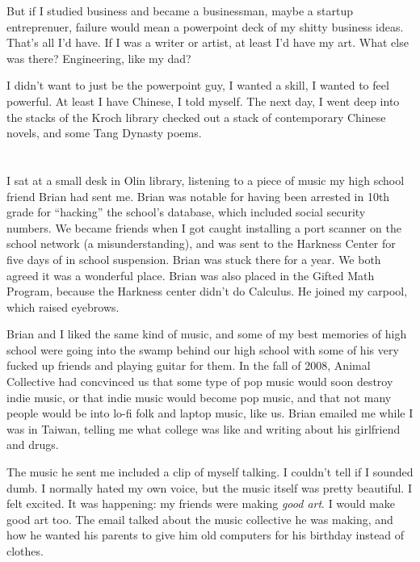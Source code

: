 But if I studied business and became a businessman, maybe a startup
entreprenuer, failure would mean a powerpoint deck of my shitty business ideas.
That's all I'd have.  If I was a writer or artist, at least I'd have my art.
What else was there?  Engineering, like my dad? 

I didn't want to just be the powerpoint guy, I wanted a skill, I wanted to feel
powerful.  At least I have Chinese, I told myself.  The next day, I went deep
into the stacks of the Kroch library checked out a stack of contemporary Chinese
novels, and some Tang Dynasty poems.

\section{}

I sat at a small desk in Olin library, listening to a piece of music my high
school friend Brian had sent me.  Brian was notable for having been arrested in
10th grade for ``hacking'' the school's database, which included social security
numbers.  We became friends when I got caught installing a port scanner on the
school network (a misunderstanding), and was sent to the Harkness Center for
five days of in school suspension.  Brian was stuck there for a year.  We both
agreed it was a wonderful place.  Brian was also placed in the Gifted Math
Program, because the Harkness center didn't do Calculus.  He joined my carpool,
which raised eyebrows.

Brian and I liked the same kind of music, and some of my best memories of high
school were going into the swamp behind our high school with some of his very
fucked up friends and playing guitar for them.  In the fall of 2008, Animal
Collective had concvinced us that some type of pop music would soon destroy
indie music, or that indie music would become pop music, and that not many
people would be into lo-fi folk and laptop music, like us.  Brian emailed me
while I was in Taiwan, telling me what college was like and writing about his
girlfriend and drugs.

The music he sent me included a clip of myself talking.  I couldn't tell if I
sounded dumb.  I normally hated my own voice, but the music itself was pretty
beautiful.  I felt excited.  It was happening: my friends were making
\textit{good art}.  I would make good art too.  The email talked about the music
collective he was making, and how he wanted his parents to give him old
computers for his birthday instead of clothes.

